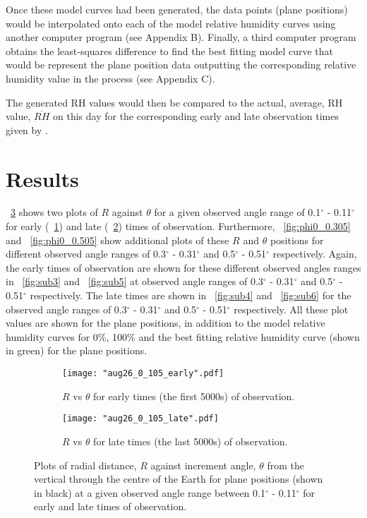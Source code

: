 \documentclass[11pt]{article}
\newcommand{\figref}[2][\figurename~]{#1\ref{#2}}
\begin{document}
\vspace{2mm}
\noindent
Once these model curves had been generated, the data points (plane positions) would be interpolated onto each of the model relative humidity curves using another computer program (see Appendix B). Finally, a third computer program obtains the least-squares difference to find the best fitting model curve that would be represent the plane position data outputting the corresponding relative humidity value in the process (see Appendix C).

\vspace{2mm}
\noindent
The generated RH values would then be compared to the actual, average, RH value, $\overline{RH}$ on this day for the corresponding early and late observation times given by \cite{Web01}.


\section{Results}
\label{sec:results}
\figref{fig:phi0_0.105} shows two plots of $R$ against $\theta$ for a given observed angle range of 0.1$^{\circ}$ - 0.11$^{\circ}$ for early (\figref{fig:sub1}) and late (\figref{fig:sub2}) times of observation. Furthermore, \figref{fig:phi0_0.305} and \figref{fig:phi0_0.505} show additional plots of these $R$ and $\theta$ positions for different observed angle ranges of 0.3$^{\circ}$ - 0.31$^{\circ}$ and 0.5$^{\circ}$ - 0.51$^{\circ}$ respectively. Again, the early times of observation are shown for these different observed angles ranges in \figref{fig:sub3} and \figref{fig:sub5} at observed angle ranges of 0.3$^{\circ}$ - 0.31$^{\circ}$ and 0.5$^{\circ}$ - 0.51$^{\circ}$ respectively. The late times are shown in \figref{fig:sub4} and \figref{fig:sub6} for the observed angle ranges of 0.3$^{\circ}$ - 0.31$^{\circ}$ and 0.5$^{\circ}$ - 0.51$^{\circ}$ respectively. All these plot values are shown for the plane positions, in addition to the model relative humidity curves for 0$\%$, 100$\%$ and the best fitting relative humidity curve (shown in green) for the plane positions.


\begin{figure}[h]
\centering
\begin{subfigure}{.5\textwidth}
  \centering
  \texttt{[image: "aug26\_0\_105\_early".pdf]}
  \caption{$R$ vs $\theta$ for early times (the first 5000s) of observation.}
  \label{fig:sub1}
\end{subfigure}%
\begin{subfigure}{.5\textwidth}
  \centering
  \texttt{[image: "aug26\_0\_105\_late".pdf]}
  \caption{$R$ vs $\theta$ for late times (the last 5000s) of observation.}
  \label{fig:sub2}
\end{subfigure}
\caption{Plots of radial distance, $R$ against increment angle, $\theta$ from the vertical through the centre of the Earth for plane positions (shown in black) at a given observed angle range between 0.1$^{\circ}$ - 0.11$^{\circ}$ for early and late times of observation.}
\label{fig:phi0_0.105}
\end{figure}
\end{document}
